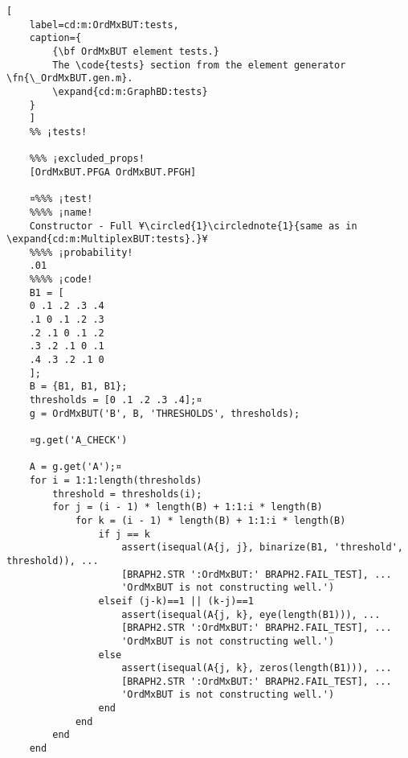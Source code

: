 \documentclass{tufte-handout}
\begin{document}
\begin{lstlisting}[
	label=cd:m:OrdMxBUT:tests,
	caption={
		{\bf OrdMxBUT element tests.}
		The \code{tests} section from the element generator \fn{\_OrdMxBUT.gen.m}.
		\expand{cd:m:GraphBD:tests}
	}
	]
	%% ¡tests!
	
	%%% ¡excluded_props!
	[OrdMxBUT.PFGA OrdMxBUT.PFGH]
	
	¤%%% ¡test!
	%%%% ¡name!
	Constructor - Full ¥\circled{1}\circlednote{1}{same as in \expand{cd:m:MultiplexBUT:tests}.}¥
	%%%% ¡probability!
	.01
	%%%% ¡code!
	B1 = [
	0 .1 .2 .3 .4 
	.1 0 .1 .2 .3
	.2 .1 0 .1 .2
	.3 .2 .1 0 .1
	.4 .3 .2 .1 0
	];
	B = {B1, B1, B1};
	thresholds = [0 .1 .2 .3 .4];¤
	g = OrdMxBUT('B', B, 'THRESHOLDS', thresholds);
	
	¤g.get('A_CHECK')
	
	A = g.get('A');¤
	for i = 1:1:length(thresholds)
		threshold = thresholds(i);
		for j = (i - 1) * length(B) + 1:1:i * length(B)
			for k = (i - 1) * length(B) + 1:1:i * length(B)
				if j == k
					assert(isequal(A{j, j}, binarize(B1, 'threshold', threshold)), ...
					[BRAPH2.STR ':OrdMxBUT:' BRAPH2.FAIL_TEST], ...
					'OrdMxBUT is not constructing well.')
				elseif (j-k)==1 || (k-j)==1
					assert(isequal(A{j, k}, eye(length(B1))), ...
					[BRAPH2.STR ':OrdMxBUT:' BRAPH2.FAIL_TEST], ...
					'OrdMxBUT is not constructing well.')
				else 
					assert(isequal(A{j, k}, zeros(length(B1))), ...
					[BRAPH2.STR ':OrdMxBUT:' BRAPH2.FAIL_TEST], ...
					'OrdMxBUT is not constructing well.')
				end
			end
		end
	end
	
\end{lstlisting}

%
%
\end{document}
